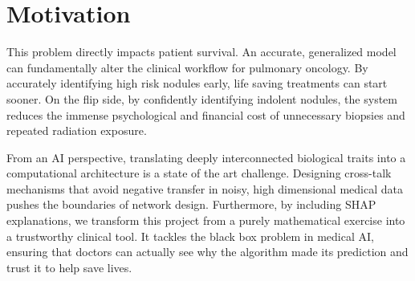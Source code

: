 \section{Motivation}
\label{section:motivation}
This problem directly impacts patient survival. An accurate, generalized model can fundamentally alter the clinical workflow for pulmonary oncology. By accurately identifying high risk nodules early, life saving treatments can start sooner. On the flip side, by confidently identifying indolent nodules, the system reduces the immense psychological and financial cost of unnecessary biopsies and repeated radiation exposure.

From an AI perspective, translating deeply interconnected biological traits into a computational architecture is a state of the art challenge. Designing cross-talk mechanisms that avoid negative transfer in noisy, high dimensional medical data pushes the boundaries of network design. Furthermore, by including SHAP explanations, we transform this project from a purely mathematical exercise into a trustworthy clinical tool. It tackles the black box problem in medical AI, ensuring that doctors can actually see why the algorithm made its prediction and trust it to help save lives.